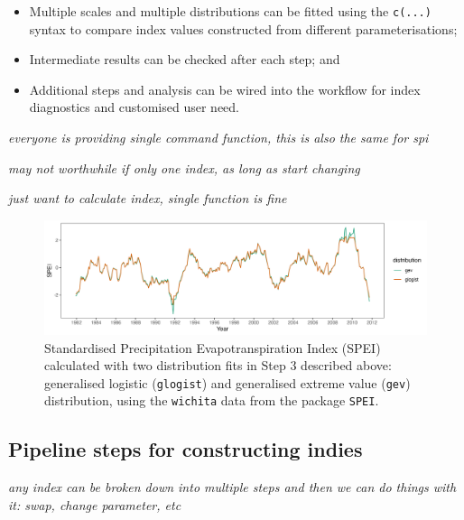 \documentclass[
]{article}
\providecommand{\tightlist}{%
  \setlength{\itemsep}{0pt}\setlength{\parskip}{0pt}}\usepackage{longtable,booktabs,array}
\begin{document}
\begin{itemize}
\tightlist
\item
  Multiple scales and multiple distributions can be fitted using the
  \texttt{c(...)} syntax to compare index values constructed from
  different parameterisations;
\item
  Intermediate results can be checked after each step; and
\item
  Additional steps and analysis can be wired into the workflow for index
  diagnostics and customised user need.
\end{itemize}

\emph{everyone is providing single command function, this is also the
same for spi}

\emph{may not worthwhile if only one index, as long as start changing}

\emph{just want to calculate index, single function is fine}

\begin{figure}

{\centering \includegraphics[width=1\textwidth,height=0.3\textheight]{../figures/toy-example-spei.png}

}

\caption{\label{fig-toy-example}Standardised Precipitation
Evapotranspiration Index (SPEI) calculated with two distribution fits in
Step 3 described above: generalised logistic (\texttt{glogist}) and
generalised extreme value (\texttt{gev}) distribution, using the
\texttt{wichita} data from the package \texttt{SPEI}.}

\end{figure}

\newpage

\hypertarget{pipeline-steps-for-constructing-indies}{%
\subsection{Pipeline steps for constructing
indies}\label{pipeline-steps-for-constructing-indies}}

\emph{any index can be broken down into multiple steps and then we can
do things with it: swap, change parameter, etc}
\end{document}
